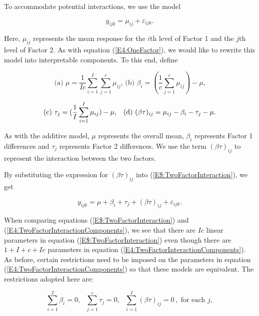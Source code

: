 To accommodate potential interactions, we use the model

\begin{equation}\label{E$:TwoFactorInteraction}
y_{ijk}=\mu_{ij}+\varepsilon_{ijk}.
\end{equation}

\noindent Here, $\mu_{ij}$ represents the mean response for the
$i$th level of Factor 1 and the $j$th level of Factor 2. As with
equation (\ref{E4:OneFactor}), we would like to rewrite this model
into interpretable components. To this end, define

\begin{equation*}
\text{(a) }\mu =\frac{1}{Ic}\sum_{i=1}^{I}\sum_{j=1}^{c}\mu
_{ij}\text{, \ \ (b) }\beta_i=(\frac{1}{c}\sum_{j=1}^{c}\mu
_{ij})-\mu \text{,}
\end{equation*}

\begin{equation*}
\text{(c) }\tau_{j}=(\frac{1}{I}\sum_{i=1}^{I}\mu_{ij})-\mu \text{,\
\ \ (d) }(\beta \tau )_{ij}=\mu_{ij}-\beta_i-\tau_{j}-\mu .
\end{equation*}

\noindent As with the additive model, $\mu $ represents the overall
mean, $\beta_i$ represents Factor 1 differences and $\tau_{j}$
represents Factor 2 differences. We use the term $(\beta \tau
)_{ij}$ to represent the interaction between the two factors.

By substituting the expression for $(\beta \tau )_{ij}$ into
(\ref{E$:TwoFactorInteraction}), we get

\begin{equation} \label{E4:TwoFactorInteractionComponents}
y_{ijk}=\mu +\beta_i+\tau_{j}+(\beta \tau )_{ij}+\varepsilon_{ijk}.
\end{equation}%
\qquad

When comparing equations (\ref{E$:TwoFactorInteraction}) and
(\ref{E4:TwoFactorInteractionComponents}), we see that there are
$Ic$ linear parameters in equation (\ref{E$:TwoFactorInteraction})
even though there are $1+I+c+Ic$ parameters in equation
(\ref{E4:TwoFactorInteractionComponents}). As before, certain
restrictions need to be imposed on the parameters in equation
(\ref{E4:TwoFactorInteractionComponents}) so that these models are
equivalent. The restrictions adopted here are:

\begin{equation*}
\sum_{i=1}^{I}\beta_i=0,\text{ }\sum_{j=1}^{c}\tau_{j}=0,\text{ }%
\sum_{i=1}^{I}(\beta \tau )_{ij}=0\,,\text{ \ for each }j,
\end{equation*}


